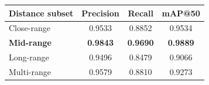 \documentclass[border=10pt]{standalone}
\begin{document}
\begin{tabular}{lccc}
\toprule
\textbf{Distance subset} & \textbf{Precision} & \textbf{Recall} & \textbf{mAP@50} \\
\midrule
Close-range              & 0.9533 & 0.8852 & 0.9534 \\
\textbf{Mid-range}       & \textbf{0.9843} & \textbf{0.9690} & \textbf{0.9889} \\
Long-range               & 0.9496 & 0.8479 & 0.9066 \\
Multi-range              & 0.9579 & 0.8810 & 0.9273 \\
\bottomrule
\end{tabular}
\end{document}
